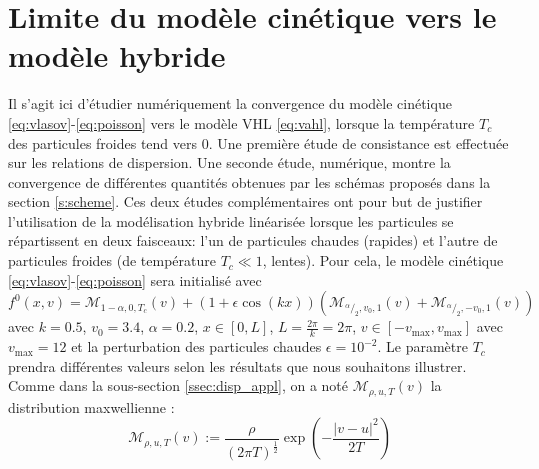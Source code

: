 
\section{Limite du modèle cinétique vers le modèle hybride}
 \label{s:limit}

Il s'agit ici d'étudier numériquement la convergence du modèle cinétique \eqref{eq:vlasov}-\eqref{eq:poisson} vers le modèle VHL \eqref{eq:vahl}, lorsque la température $T_c$ des particules froides tend vers 0. Une première étude de consistance est effectuée sur les relations de dispersion. Une seconde étude, numérique, montre la convergence de différentes quantités obtenues par les schémas proposés dans la section \ref{s:scheme}. Ces deux études complémentaires ont pour but de justifier l'utilisation de la modélisation hybride linéarisée lorsque les particules se répartissent en deux faisceaux: l'un de particules chaudes (rapides) et l'autre de particules froides (de température $T_c\ll 1$, lentes). Pour cela, le modèle cinétique \eqref{eq:vlasov}-\eqref{eq:poisson} sera initialisé avec
\begin{equation}
  f^0(x,v) = \mathcal{M}_{1-\alpha,0,T_c}(v) + (1+\epsilon\cos(kx))\left( \mathcal{M}_{^\alpha/_2,v_0,1}(v) + \mathcal{M}_{^\alpha/_2,-v_0,1}(v) \right)
\label{eq:K:init}
\end{equation}
avec $k = 0.5$, $v_0 = 3.4$, $\alpha=0.2$, $x\in[0,L]$, $L=\frac{2\pi}{k}=2\pi$, $v\in[-v_{\text{max}},v_{\text{max}}]$ avec $v_{\text{max}}=12$ et la perturbation des particules chaudes $\epsilon = 10^{-2}$. Le paramètre $T_c$ prendra différentes valeurs selon les résultats que nous souhaitons illustrer. Comme dans la sous-section \ref{ssec:disp_appl}, on a noté  $\mathcal{M}_{\rho,u,T}(v)$ la distribution maxwellienne :
$$
  \mathcal{M}_{\rho,u,T}(v) := \frac{\rho}{(2\pi T)^{\frac{1}{2}}}\exp\left(-\frac{\left|v-u\right|^2}{2T}\right)
$$

